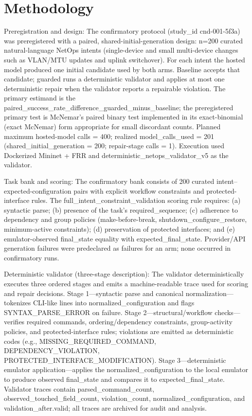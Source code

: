 \documentclass[conference]{IEEEtran}
\begin{document}
\section{Methodology}
Preregistration and design: The confirmatory protocol (study\_id cnd-001-5f3a) was preregistered with a paired, shared-initial-generation design: n=200 curated natural-language NetOps intents (single-device and small multi-device changes such as VLAN/MTU updates and uplink switchover). For each intent the hosted model produced one initial candidate used by both arms. Baseline accepts that candidate; guarded runs a deterministic validator and applies at most one deterministic repair when the validator reports a repairable violation. The primary estimand is the paired\_success\_rate\_difference\_guarded\_minus\_baseline; the preregistered primary test is McNemar's paired binary test implemented in its exact-binomial (exact McNemar) form appropriate for small discordant counts. Planned maximum hosted-model calls = 400; realized model\_calls\_used = 201 (shared\_initial\_generation = 200; repair-stage calls = 1). Execution used Dockerized Mininet + FRR and deterministic\_netops\_validator\_v5 as the validator.

Task bank and scoring: The confirmatory bank consists of 200 curated intent--expected-configuration pairs with explicit workflow constraints and protected-interface rules. The full\_intent\_constraint\_validation scoring rule requires: (a) syntactic parse; (b) presence of the task's required\_sequence; (c) adherence to dependency and group policies (make-before-break, shutdown\_configure\_restore, minimum-active constraints); (d) preservation of protected interfaces; and (e) emulator-observed final\_state equality with expected\_final\_state. Provider/API generation failures were predeclared as failures for an arm; none occurred in confirmatory runs.

Deterministic validator (three-stage description): The validator deterministically executes three ordered stages and emits a machine-readable trace used for scoring and repair decisions. Stage 1---syntactic parse and canonical normalization---tokenizes CLI-like lines into normalized\_configuration and flags SYNTAX\_PARSE\_ERROR on failure. Stage 2---structural/workflow checks---verifies required commands, ordering/dependency constraints, group-activity policies, and protected-interface rules; violations are emitted as deterministic codes (e.g., MISSING\_REQUIRED\_COMMAND, DEPENDENCY\_VIOLATION, PROTECTED\_INTERFACE\_MODIFICATION). Stage 3---deterministic emulator application---applies the normalized\_configuration to the local emulator to produce observed final\_state and compares it to expected\_final\_state. Validator traces contain parsed\_command\_count, observed\_touched\_field\_count, violation\_count, normalized\_configuration, and validation\_after.valid; all traces are archived for audit and analysis.
\end{document}
